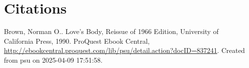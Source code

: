 \documentclass{article}
\begin{document}
\section{Citations}

Brown, Norman O.. Love's Body, Reissue of 1966 Edition, University of California Press, 1990. ProQuest Ebook Central, \url{http://ebookcentral.proquest.com/lib/psu/detail.action?docID=837241}.
Created from psu on 2025-04-09 17:51:58. 
\end{document}
